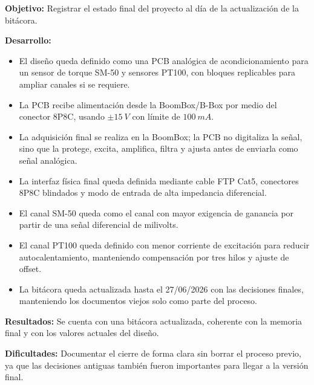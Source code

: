 \documentclass[12pt]{article}
\begin{document}
\textbf{Objetivo:}
Registrar el estado final del proyecto al día de la actualización de la bitácora.

\textbf{Desarrollo:}
\begin{itemize}
\item El diseño queda definido como una PCB analógica de acondicionamiento para un sensor de torque SM-50 y sensores PT100, con bloques replicables para ampliar canales si se requiere.
\item La PCB recibe alimentación desde la BoomBox/B-Box por medio del conector 8P8C, usando \(\pm\SI{15}{V}\) con límite de \(\SI{100}{mA}\).
\item La adquisición final se realiza en la BoomBox; la PCB no digitaliza la señal, sino que la protege, excita, amplifica, filtra y ajusta antes de enviarla como señal analógica.
\item La interfaz física final queda definida mediante cable FTP Cat5, conectores 8P8C blindados y modo de entrada de alta impedancia diferencial.
\item El canal SM-50 queda como el canal con mayor exigencia de ganancia por partir de una señal diferencial de milivolts.
\item El canal PT100 queda definido con menor corriente de excitación para reducir autocalentamiento, manteniendo compensación por tres hilos y ajuste de offset.
\item La bitácora queda actualizada hasta el 27/06/2026 con las decisiones finales, manteniendo los documentos viejos solo como parte del proceso.
\end{itemize}

\textbf{Resultados:}
Se cuenta con una bitácora actualizada, coherente con la memoria final y con los valores actuales del diseño.

\textbf{Dificultades:}
Documentar el cierre de forma clara sin borrar el proceso previo, ya que las decisiones antiguas también fueron importantes para llegar a la versión final.
\end{document}
